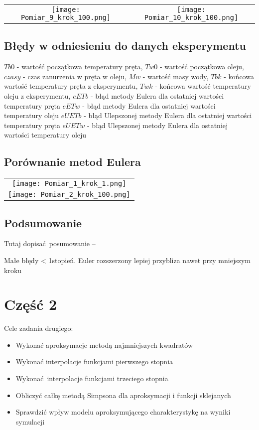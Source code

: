 \documentclass[varwidth,12pt,a4paper]{article}
\begin{document}
\begin{tabular}{cc}
    \texttt{[image: Pomiar\_9\_krok\_100.png]} &
    \texttt{[image: Pomiar\_10\_krok\_100.png]} 
\end{tabular}

\subsection{Błędy w odniesieniu do danych eksperymentu}

$Tb0$ - wartość początkowa temperatury pręta,
$Tw0$ - wartość początkowa oleju,
$czasy$ - czas zanurzenia w pręta w oleju,
$Mw$ - wartość masy wody,
$Tbk$ - końcowa wartość temperatury pręta z eksperymentu,
$Twk$ - końcowa wartość temperatury oleju z eksperymentu,
$eETb$ - błąd metody Eulera dla ostatniej wartości temperatury pręta
$eETw$ - błąd metody Eulera dla ostatniej wartości temperatury oleju
$eUETb$ - błąd Ulepszonej metody Eulera dla ostatniej wartości temperatury pręta
$eUETw$ - błąd Ulepszonej metody Eulera dla ostatniej wartości temperatury oleju

\subsection{Porównanie metod Eulera}

\begin{tabular}{c}
    \texttt{[image: Pomiar\_1\_krok\_1.png]} \\
    \texttt{[image: Pomiar\_2\_krok\_100.png]} 
\end{tabular}

\subsection{Podsumowanie}

Tutaj dopisać posumowanie --

Małe błędy < 1stopień.
Euler rozszerzony lepiej przybliza nawet przy mniejszym kroku

\section{Część 2}

Cele zadania drugiego:

\begin{itemize}
  \item Wykonać aproksymacje metodą najmniejszych kwadratów
  \item Wykonać interpolacje funkcjami pierwszego stopnia
  \item Wykonać interpolacje funkcjami trzeciego stopnia
  \item Obliczyć całkę metodą Simpsona dla aproksymacji i funkcji sklejanych
  \item Sprawdzić wpływ modelu aproksymującego charakterystykę na wyniki symulacji
\end{itemize}
\end{document}

